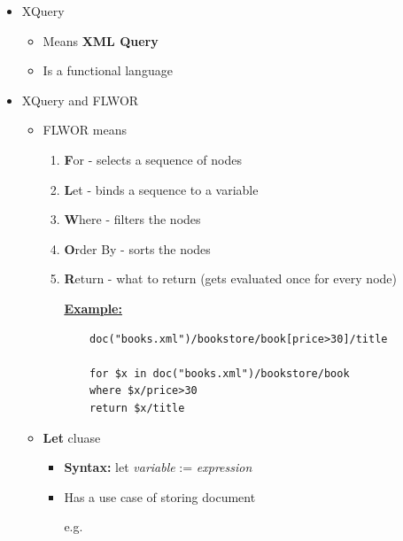 \documentclass[12pt]{article}
\begin{document}
\begin{enumerate}[1.]
\begin{enumerate}[a)]
        \begin{itemize}
            \item XQuery
            \begin{itemize}
                \item Means \textbf{XML Query}
                \item Is a functional language
            \end{itemize}
            \item XQuery and FLWOR
            \begin{itemize}
                \item FLWOR means
                \begin{enumerate}[1.]
                    \item \textbf{F}or - selects a sequence of nodes
                    \item \textbf{L}et - binds a sequence to a variable
                    \item \textbf{W}here - filters the nodes
                    \item \textbf{O}rder By - sorts the nodes
                    \item \textbf{R}eturn - what to return (gets evaluated once for every node)

                    \bigskip

                    \underline{\textbf{Example:}}

                    \bigskip

    \begin{lstlisting}
    doc("books.xml")/bookstore/book[price>30]/title

    for $x in doc("books.xml")/bookstore/book
    where $x/price>30
    return $x/title
    \end{lstlisting}

                \end{enumerate}
                \item \textbf{Let} cluase
                \begin{itemize}
                    \item \textbf{Syntax:} let \textit{variable} := \textit{expression}
                    \item Has a use case of storing document

                    \bigskip

                    e.g.

                    \bigskip


\end{itemize}
\end{itemize}
\end{itemize}
\end{enumerate}
\end{enumerate}
\end{document}
